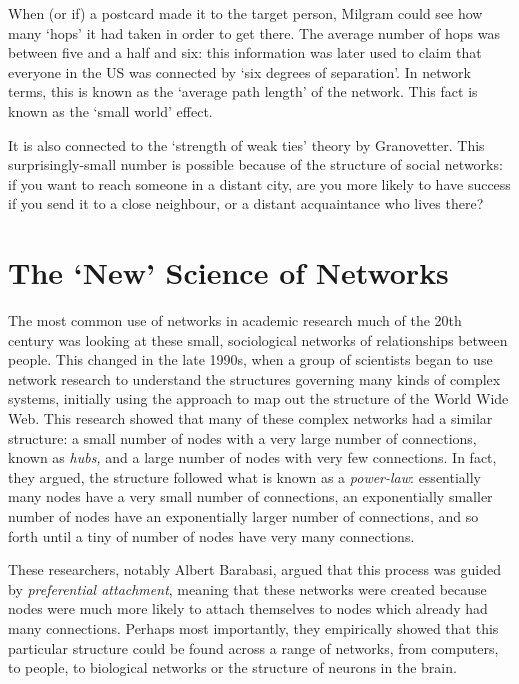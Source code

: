 \documentclass[
]{book}
\begin{document}
When (or if) a postcard made it to the target person, Milgram could see how many `hops' it had taken in order to get there. The average number of hops was between five and a half and six: this information was later used to claim that everyone in the US was connected by `six degrees of separation'. In network terms, this is known as the `average path length' of the network. This fact is known as the `small world' effect.

It is also connected to the `strength of weak ties' theory by Granovetter. This surprisingly-small number is possible because of the structure of social networks: if you want to reach someone in a distant city, are you more likely to have success if you send it to a close neighbour, or a distant acquaintance who lives there?

\hypertarget{the-new-science-of-networks}{%
\section{The `New' Science of Networks}\label{the-new-science-of-networks}}

The most common use of networks in academic research much of the 20th century was looking at these small, sociological networks of relationships between people. This changed in the late 1990s, when a group of scientists began to use network research to understand the structures governing many kinds of complex systems, initially using the approach to map out the structure of the World Wide Web. This research showed that many of these complex networks had a similar structure: a small number of nodes with a very large number of connections, known as \emph{hubs,} and a large number of nodes with very few connections. In fact, they argued, the structure followed what is known as a \emph{power-law}: essentially many nodes have a very small number of connections, an exponentially smaller number of nodes have an exponentially larger number of connections, and so forth until a tiny of number of nodes have very many connections.

These researchers, notably Albert Barabasi, argued that this process was guided by \emph{preferential attachment}, meaning that these networks were created because nodes were much more likely to attach themselves to nodes which already had many connections. Perhaps most importantly, they empirically showed that this particular structure could be found across a range of networks, from computers, to people, to biological networks or the structure of neurons in the brain.
\end{document}
